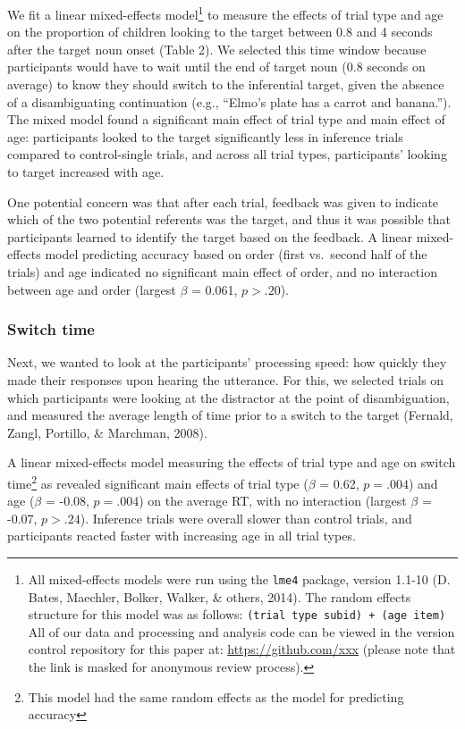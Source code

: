 \documentclass[a4paper,man,apacite,floatsintext]{apa6}
\begin{document}
We fit a linear mixed-effects model\footnote{All mixed-effects models
  were run using the \texttt{lme4} package, version 1.1-10 (D. Bates,
  Maechler, Bolker, Walker, \& others, 2014). The random effects
  structure for this model was as follows:
  \texttt{(trial type \textbar{} subid) + (age \textbar{} item)} All of
  our data and processing and analysis code can be viewed in the version
  control repository for this paper at: \url{https://github.com/xxx}
  (please note that the link is masked for anonymous review process).}
to measure the effects of trial type and age on the proportion of
children looking to the target between 0.8 and 4 seconds after the
target noun onset (Table 2). We selected this time window because
participants would have to wait until the end of target noun (0.8
seconds on average) to know they should switch to the inferential
target, given the absence of a disambiguating continuation (e.g.,
``Elmo's plate has a carrot and banana.''). The mixed model found a
significant main effect of trial type and main effect of age:
participants looked to the target significantly less in inference trials
compared to control-single trials, and across all trial types,
participants' looking to target increased with age.

One potential concern was that after each trial, feedback was given to
indicate which of the two potential referents was the target, and thus
it was possible that participants learned to identify the target based
on the feedback. A linear mixed-effects model predicting accuracy based
on order (first vs.~second half of the trials) and age indicated no
significant main effect of order, and no interaction between age and
order (largest \(\beta\) = 0.061, \(p >.20\)).

\subsubsection{Switch time}\label{switch-time}

Next, we wanted to look at the participants' processing speed: how
quickly they made their responses upon hearing the utterance. For this,
we selected trials on which participants were looking at the distractor
at the point of disambiguation, and measured the average length of time
prior to a switch to the target (Fernald, Zangl, Portillo, \& Marchman,
2008).

A linear mixed-effects model measuring the effects of trial type and age
on switch time\footnote{This model had the same random effects as the
  model for predicting accuracy} as revealed significant main effects of
trial type (\(\beta\) = 0.62, \(p =.004\)) and age (\(\beta\) = -0.08,
\(p =.004\)) on the average RT, with no interaction (largest \(\beta\) =
-0.07, \(p >.24\)). Inference trials were overall slower than control
trials, and participants reacted faster with increasing age in all trial
types.
\end{document}

